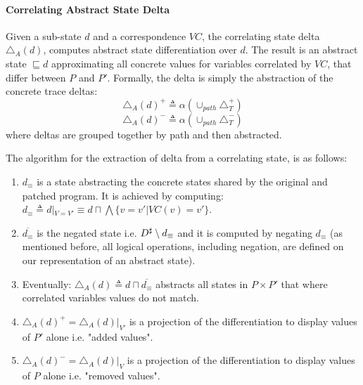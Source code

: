 \paragraph{Correlating Abstract State Delta} 
\begin{definition}
Given a sub-state $d$ and a correspondence $VC$, the correlating state delta $\triangle_{A}(d)$, computes abstract state differentiation over $d$. The result is an abstract state $\sqsubseteq d$ approximating all concrete values for variables correlated by $VC$, that differ between $P$ and $P'$. Formally, the delta is simply the abstraction of the concrete trace deltas:
\[
\triangle_{A}(d)^{+} \triangleq \alpha(\cup_{path}\triangle_{T}^{+})
\]
\[
\triangle_{A}(d)^{-} \triangleq \alpha(\cup_{path}\triangle_{T}^{-})
\]
where deltas are grouped together by path and then abstracted.
\end{definition}
The algorithm for the extraction of delta from a correlating state, is as follows:
\begin{enumerate}
\item $d_{\equiv}$ is a state abstracting the concrete states shared by the original and patched program. It is achieved by computing: $d_{\equiv} \triangleq d|_{V=V'} \equiv d \sqcap \bigwedge\{ v = v' | VC(v) = v'\}$.
\item $\overline{d_{\equiv}}$ is the negated state i.e. $D^\sharp \setminus d_{\equiv}$ and it is computed by negating $d_{\equiv}$ (as mentioned before, all logical operations, including negation, are defined on our representation of an abstract state).
\item Eventually: $\triangle_{A}(d) \triangleq d \sqcap \overline{d_{\equiv}}$ abstracts all states in $P \times P'$ that where correlated variables values do not match.
\item $\triangle_{A}(d)^{+} = \triangle_{A}(d)|_{V'}$ is a projection of the differentiation to display values of $P'$ alone i.e. "added values".
\item $\triangle_{A}(d)^{-} = \triangle_{A}(d)|_{V}$ is a projection of the differentiation to display values of $P$ alone i.e. "removed values".
\end{enumerate}
